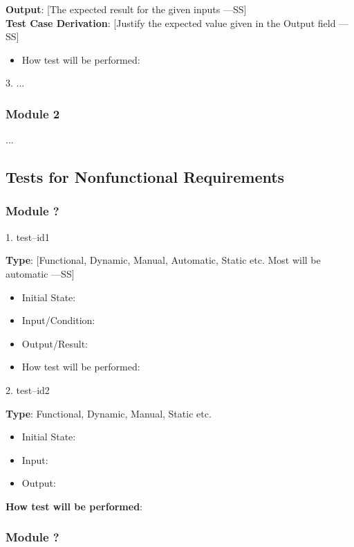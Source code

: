 \documentclass[12pt, titlepage]{article}
\begin{document}
\textbf{Output}: [The expected result for the given inputs —SS]\\
\textbf{Test Case Derivation}: [Justify the expected value given in the Output field —SS]\\
\begin{itemize}
  \item How test will be performed:
\end{itemize}

3. ...

\subsubsection{Module 2}

...

\subsection{Tests for Nonfunctional Requirements}

\subsubsection{Module ?}

1. test--id1

\textbf{Type}: [Functional, Dynamic, Manual, Automatic, Static etc. Most will be automatic —SS]\\
\begin{itemize}
  \item Initial State:
  \item Input/Condition:
  \item Output/Result:
  \item How test will be performed:
\end{itemize}

2. test--id2

\textbf{Type}: Functional, Dynamic, Manual, Static etc.\\
\begin{itemize}
  \item Initial State:
  \item Input:
  \item Output:
\end{itemize}

\textbf{How test will be performed}: \\
\subsubsection{Module ?}
\end{document}
